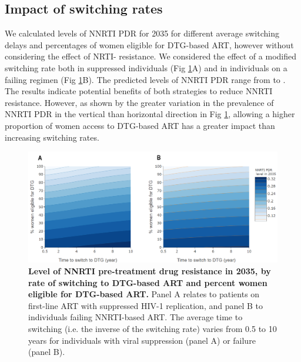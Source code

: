 \documentclass[10pt,letterpaper]{article}
\begin{document}
\subsection*{Impact of switching rates}
We calculated levels of NNRTI PDR for 2035 for different average switching delays and percentages of women eligible for DTG-based ART, however without considering the effect of NRTI- resistance. We considered the effect of a modified switching rate both in suppressed individuals (Fig \ref{fig4}A) and in individuals on a failing regimen (Fig \ref{fig4}B). The predicted levels of NNRTI PDR range from \numberja to \numberjb. The results indicate potential benefits of both strategies to reduce NNRTI resistance. However, as shown by the greater variation in the prevalence of NNRTI PDR in the vertical than horizontal direction in Fig \ref{fig4}, allowing a higher proportion of women access to DTG-based ART has a greater impact than increasing switching rates.

\begin{figure}[h]
   \includegraphics[width=14cm]{../figures/Fig4r.png}
   \vspace{0.5cm}
   \caption{{\bf Level of NNRTI pre-treatment drug resistance in 2035, by rate of switching to DTG-based ART and percent women eligible for DTG-based ART.}
Panel A relates to patients on first-line ART with suppressed HIV-1 replication, and panel B to individuals failing NNRTI-based ART. The average time to switching (i.e. the inverse of the switching rate) varies from 0.5 to 10 years for individuals with viral suppression (panel A) or failure (panel B).}\label{fig4}
\end{figure}
\end{document}
